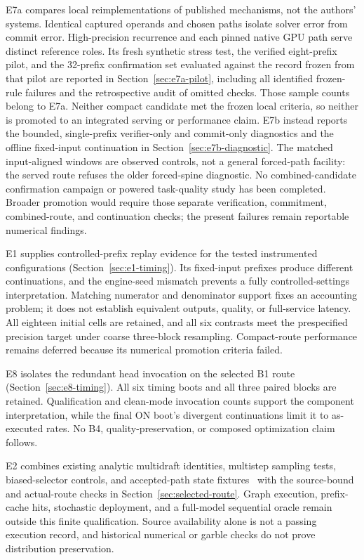 \documentclass[conference]{IEEEtran}
\begin{document}
E7a compares local reimplementations of published mechanisms, not the authors' systems. Identical captured operands and chosen paths isolate solver error from commit error. High-precision recurrence and each pinned native GPU path serve distinct reference roles. Its fresh synthetic stress test, the verified eight-prefix pilot, and the 32-prefix confirmation set evaluated against the record frozen from that pilot are reported in Section~\ref{sec:e7a-pilot}, including all identified frozen-rule failures and the retrospective audit of omitted checks. Those sample counts belong to E7a. Neither compact candidate met the frozen local criteria, so neither is promoted to an integrated serving or performance claim. E7b instead reports the bounded, single-prefix verifier-only and commit-only diagnostics and the offline fixed-input continuation in Section~\ref{sec:e7b-diagnostic}. The matched input-aligned windows are observed controls, not a general forced-path facility: the served route refuses the older forced-spine diagnostic. No combined-candidate confirmation campaign or powered task-quality study has been completed. Broader promotion would require those separate verification, commitment, combined-route, and continuation checks; the present failures remain reportable numerical findings.

E1 supplies controlled-prefix replay evidence for the tested instrumented configurations (Section~\ref{sec:e1-timing}). Its fixed-input prefixes produce different continuations, and the engine-seed mismatch prevents a fully controlled-settings interpretation. Matching numerator and denominator support fixes an accounting problem; it does not establish equivalent outputs, quality, or full-service latency. All eighteen initial cells are retained, and all six contrasts meet the prespecified precision target under coarse three-block resampling. Compact-route performance remains deferred because its numerical promotion criteria failed.

E8 isolates the redundant head invocation on the selected B1 route (Section~\ref{sec:e8-timing}). All six timing boots and all three paired blocks are retained. Qualification and clean-mode invocation counts support the component interpretation, while the final ON boot's divergent continuations limit it to as-executed rates. No B4, quality-preservation, or composed optimization claim follows.

E2 combines existing analytic multidraft identities, multistep sampling tests, biased-selector controls, and accepted-path state fixtures~\cite{lumo2026archive} with the source-bound and actual-route checks in Section~\ref{sec:selected-route}. Graph execution, prefix-cache hits, stochastic deployment, and a full-model sequential oracle remain outside this finite qualification. Source availability alone is not a passing execution record, and historical numerical or garble checks do not prove distribution preservation.

\label{ReferencesStart}


\end{document}
